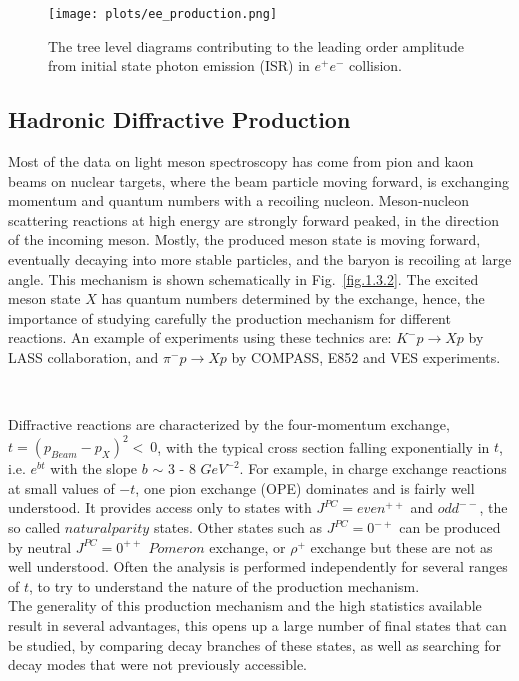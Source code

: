 \begin{figure}[H]
    \centering
        \texttt{[image: plots/ee\_production.png]}
        \caption{The tree level diagrams contributing to the leading order amplitude from initial state photon emission (ISR) in $e^{+}e^{-}$ collision.}
        \label{fig.1.3.1}
\end{figure}
 
 \subsection{Hadronic Diffractive Production}

 Most of the data on light meson spectroscopy has come from pion and kaon beams on nuclear targets, where the beam particle moving forward, is exchanging momentum and quantum numbers with a recoiling nucleon. Meson-nucleon scattering reactions at high energy are strongly forward peaked, in the direction of the incoming meson. Mostly, the produced meson state is moving forward, eventually decaying into more stable particles, and the baryon is recoiling at large angle. This mechanism is shown schematically in Fig.~\ref{fig.1.3.2}. The excited meson state $X$ has quantum numbers determined by the exchange, hence, the importance of studying carefully the production mechanism for different reactions. An example of experiments using these technics are: $K^{-}p \rightarrow Xp$ by LASS collaboration, and $\pi^{-}p \rightarrow Xp$ by COMPASS, E852 and VES experiments.

 ~\par Diffractive reactions are characterized by the four-momentum exchange, $t = (p_{Beam}-p_{X})^{2}<~0$, with the typical cross section falling exponentially in $t$, i.e. $e^{bt}$ with the slope $b$ $\sim$ 3 - 8 $GeV^{-2}$. For example, in charge exchange reactions at small values of $-t$, one pion exchange (OPE) dominates and is fairly well understood. It provides access only to states with $J^{PC} = even^{++}$ and $odd^{--}$, the so called $natural parity$ states. Other states such as $J^{PC} = 0^{-+}$ can be produced by neutral $J^{PC} = 0^{++}$ $Pomeron$ exchange, or $\rho^{+}$ exchange but these are not as well understood. Often the analysis is performed independently for several ranges of $t$, to try to understand the nature of the production mechanism.\\
The generality of this production mechanism and the high statistics available result in several advantages, this opens up a large number of final states that can be studied, by comparing decay branches of these states, as well as searching for decay modes that were not previously accessible.

